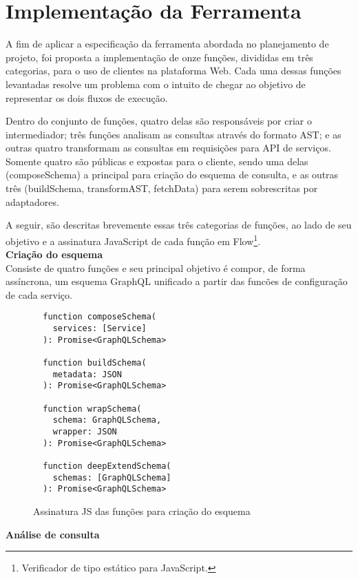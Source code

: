 \section{Implementação da Ferramenta}

A fim de aplicar a especificação da ferramenta abordada no planejamento de projeto, foi proposta a implementação de onze funções, divididas em três categorias, para o uso de clientes na plataforma Web. Cada uma dessas funções levantadas resolve um problema com o intuito de chegar ao objetivo de representar os dois fluxos de execução.

Dentro do conjunto de funções, quatro delas são responsáveis por criar o intermediador; três funções analisam as consultas através do formato AST; e as outras quatro transformam as consultas em requisições para API de serviços. Somente quatro são públicas e expostas para o cliente, sendo uma delas (composeSchema) a principal para criação do esquema de consulta, e as outras três (buildSchema, transformAST, fetchData) para serem sobrescritas por adaptadores.

A seguir, são descritas brevemente essas três categorias de funções, ao lado de seu objetivo e a assinatura JavaScript de cada função em Flow\footnote{
  Verificador de tipo estático para JavaScript.
}. \\

\textbf{Criação do esquema} \\

Consiste de quatro funções e seu principal objetivo é compor, de forma assíncrona, um esquema GraphQL unificado a partir das funcões de configuração de cada serviço.

\begin{figure}[H]
  \centering
  \begin{verbatim}
  function composeSchema(
    services: [Service]
  ): Promise<GraphQLSchema>

  function buildSchema(
    metadata: JSON
  ): Promise<GraphQLSchema>

  function wrapSchema(
    schema: GraphQLSchema,
    wrapper: JSON
  ): Promise<GraphQLSchema>

  function deepExtendSchema(
    schemas: [GraphQLSchema]
  ): Promise<GraphQLSchema>
  \end{verbatim}
  \caption{Assinatura JS das funções para criação do esquema}
\end{figure}

\textbf{Análise de consulta} \\

